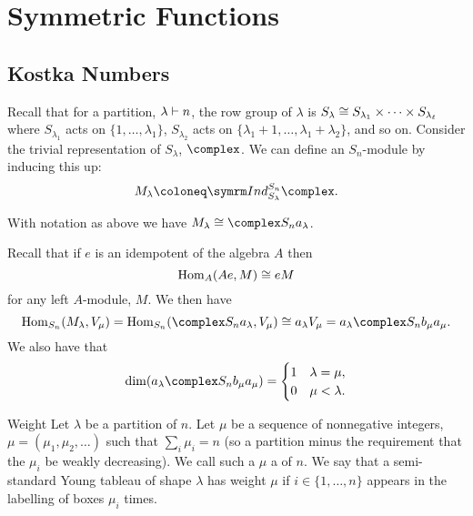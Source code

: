 \chapter{Symmetric Functions}
\section{Kostka Numbers}
Recall that for a partition, \(\lambda \vdash n\), the row group of \(\lambda\) is \(S_\lambda \cong S_{\lambda_1} \times \dotsb \times S_{\lambda_\ell}\) where \(S_{\lambda_1}\) acts on \(\{1, \dotsc, \lambda_1\}\), \(S_{\lambda_2}\) acts on \(\{\lambda_1 + 1, \dotsc, \lambda_1 + \lambda_2\}\), and so on.
Consider the trivial representation of \(S_\lambda\), \(\complex\).
We can define an \(S_n\)-module by inducing this up:
\begin{equation}
    M_\lambda \coloneq \Ind^{S_n}_{S_\lambda} \complex.
\end{equation}

\begin{lma}{}{}
    With notation as above we have \(M_\lambda \isomorphic \complex S_n a_\lambda\).
\end{lma}

Recall that if \(e\) is an idempotent of the algebra \(A\) then
\begin{equation}
    \operatorname{Hom}_A(Ae, M) \cong eM
\end{equation}
for any left \(A\)-module, \(M\).
We then have
\begin{equation}
    \Hom_{S_n}(M_\lambda, V_\mu) = \Hom_{S_n}(\complex S_n a_\lambda, V_\mu) \isomorphic a_\lambda V_\mu = a_\lambda \complex S_n b_\mu a_\mu.
\end{equation}
We also have that
\begin{equation}
    \dim(a_\lambda \complex S_n b_\mu a_\mu) = 
    \begin{cases}
        1 & \lambda = \mu,\\
        0 & \mu < \lambda.
    \end{cases}
\end{equation}

\begin{dfn}{Weight}{}
    Let \(\lambda\) be a partition of \(n\).
    Let \(\mu\) be a sequence of nonnegative integers, \(\mu = (\mu_1, \mu_2, \dotsc)\) such that \(\sum_i \mu_i = n\) (so a partition minus the requirement that the \(\mu_i\) be weakly decreasing).
    We call such a \(\mu\) a  of \(n\).
    We say that a semi-standard Young tableau of shape \(\lambda\) has weight \(\mu\) if \(i \in \{1, \dotsc, n\}\) appears in the labelling of boxes \(\mu_i\) times.
\end{dfn}

